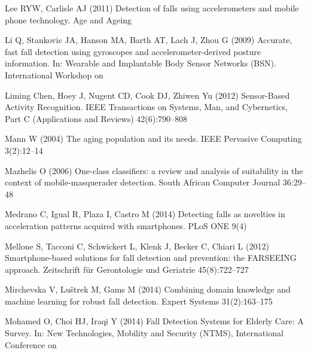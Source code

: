 \documentclass[twocolumn]{svjour3}          \smartqed  \usepackage[draft]{hyperref}
\begin{document}
\begin{thebibliography}{41}
Lee RYW, Carlisle AJ (2011) Detection of falls using accelerometers and mobile
  phone technology. Age and Ageing

Li Q, Stankovic JA, Hanson MA, Barth AT, Lach J, Zhou G (2009) Accurate, fast
  fall detection using gyroscopes and accelerometer-derived posture
  information. In: Wearable and {Implantable} {Body} {Sensor} {Networks}
  {(BSN)}. {International} {Workshop} on

{Liming Chen}, Hoey J, Nugent CD, Cook DJ, {Zhiwen Yu} (2012) Sensor-{Based}
  {Activity} {Recognition}. IEEE Transactions on Systems, Man, and Cybernetics,
  Part C (Applications and Reviews) 42(6):790--808

Mann W (2004) The aging population and its needs. {IEEE} Pervasive Computing
  3(2):12--14

Mazhelis O (2006) One-class classifiers: a review and analysis of suitability
  in the context of mobile-masquerader detection. South African Computer
  Journal 36:29--48

Medrano C, Igual R, Plaza I, Castro M (2014) Detecting falls as novelties in
  acceleration patterns acquired with smartphones. PLoS ONE 9(4)

Mellone S, Tacconi C, Schwickert L, Klenk J, Becker C, Chiari L (2012)
  Smartphone-based solutions for fall detection and prevention: the {FARSEEING}
  approach. Zeitschrift f{\"u}r Gerontologie und Geriatrie 45(8):722--727

Mirchevska V, Luštrek M, Gams M (2014) Combining domain knowledge and machine
  learning for robust fall detection. Expert Systems 31(2):163--175

Mohamed O, Choi HJ, Iraqi Y (2014) Fall {Detection} {Systems} for {Elderly}
  {Care}: {A} {Survey}. In: New {Technologies}, {Mobility} and {Security}
  ({NTMS}), {International} {Conference} on


\end{thebibliography}
\end{document}
